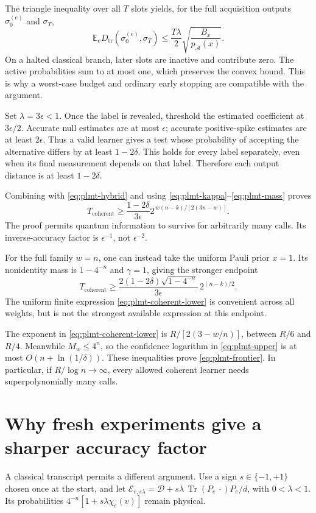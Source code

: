 \documentclass[11pt,a4paper]{article}
\numberwithin{equation}{section}
\theoremstyle{definition}
\theoremstyle{remark}
\newcommand{\Dep}{\mathcal D}
\begin{document}
The triangle inequality over all \(T\) slots yields, for the full acquisition outputs \(\sigma_0^{(e)}\) and \(\sigma_T\),
\begin{equation}
 \mathbb E_eD_{\mathrm{tr}}(\sigma_0^{(e)},\sigma_T)
 \leq\frac{T\lambda}{2}\sqrt{\frac{B_x}{p_{\mathcal A}(x)}}.
 \label{eq:plmt-hybrid}
\end{equation}
On a halted classical branch, later slots are inactive and contribute zero. The active probabilities sum to at most one, which preserves the convex bound. This is why a worst-case budget and ordinary early stopping are compatible with the argument.

Set \(\lambda=3\epsilon<1\). Once the label is revealed, threshold the estimated coefficient at \(3\epsilon/2\). Accurate null estimates are at most \(\epsilon\); accurate positive-spike estimates are at least \(2\epsilon\). Thus a valid learner gives a test whose probability of accepting the alternative differs by at least \(1-2\delta\). This holds for every label separately, even when its final measurement depends on that label. Therefore each output distance is at least \(1-2\delta\).

Combining with \eqref{eq:plmt-hybrid} and using \eqref{eq:plmt-kappa}--\eqref{eq:plmt-mass} proves
\begin{equation}
 \boxed{T_{\mathrm{coherent}}\geq
 \frac{1-2\delta}{3\epsilon}
 2^{\,w(n-k)/[2(3n-w)]}.}
 \label{eq:plmt-coherent-lower}
\end{equation}
The proof permits quantum information to survive for arbitrarily many calls. Its inverse-accuracy factor is \(\epsilon^{-1}\), not \(\epsilon^{-2}\).

For the full family \(w=n\), one can instead take the uniform Pauli prior \(x=1\). Its nonidentity mass is \(1-4^{-n}\) and \(\gamma=1\), giving the stronger endpoint
\[
 T_{\mathrm{coherent}}\geq
 \frac{2(1-2\delta)\sqrt{1-4^{-n}}}{3\epsilon}\,2^{(n-k)/2}.
\]
The uniform finite expression \eqref{eq:plmt-coherent-lower} is convenient across all weights, but is not the strongest available expression at this endpoint.

The exponent in \eqref{eq:plmt-coherent-lower} is
\(R/[2(3-w/n)]\), between \(R/6\) and \(R/4\).
Meanwhile \(M_w\leq4^n\), so the confidence logarithm in
\eqref{eq:plmt-upper} is at most \(O(n+\ln(1/\delta))\).
These inequalities prove \eqref{eq:plmt-frontier}. In particular, if
\(R/\log n\to\infty\), every allowed coherent learner needs superpolynomially many calls.

\section{Why fresh experiments give a sharper accuracy factor}
A classical transcript permits a different argument. Use a sign \(s\in\{-1,+1\}\) chosen once at the start, and let
\(\mathcal E_{e,s\lambda}=\Dep+s\lambda\,\operatorname{Tr}(P_e\,\cdot)P_e/d\), with \(0<\lambda<1\). Its probabilities
\(4^{-n}[1+s\lambda\chi_e(v)]\) remain physical.
\end{document}
